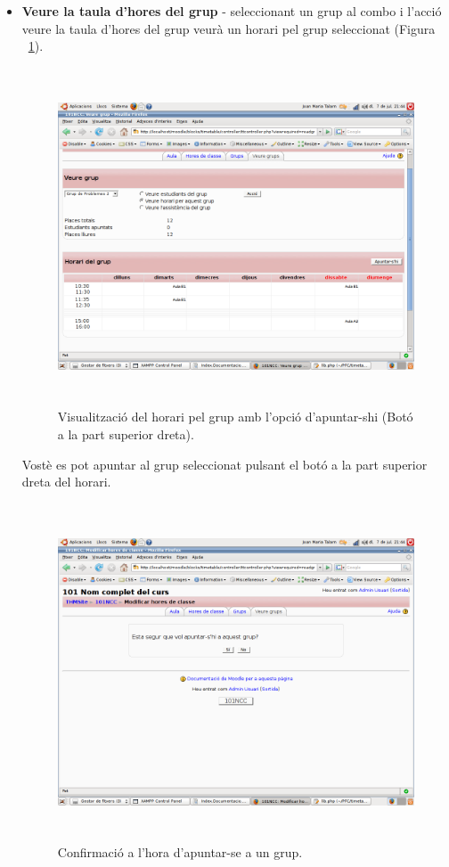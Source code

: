 \documentclass[a4paper]{report}  %
\begin{document}
\begin{itemize}
\item\textbf{Veure la taula d'hores del grup} - seleccionant un grup al combo i l'acció veure la taula d'hores del grup veurà un horari pel grup seleccionat (Figura ~\ref{fig:VeureGrupsHorari}).
		\begin{figure}[H] %
		\begin{center}
		\includegraphics[height=10cm,width=12cm]{img/VeureGrupsHorari.png}
		\caption[List caption]{Visualització del horari pel grup amb l'opció d'apuntar-shi (Botó a la part superior dreta).}
		\label{fig:VeureGrupsHorari}
		\end{center}
		\end{figure}
Vostè es pot apuntar al grup seleccionat pulsant el botó a la part superior dreta del horari.
		\begin{figure}[H] %
		\begin{center}
		\includegraphics[height=10cm,width=12cm]{img/VeureGrupConfirmaApuntarse.png}
		\caption[List caption]{Confirmació a l'hora d'apuntar-se a un grup.}
		\label{fig:VeureGrupConfirmaApuntarse}
		\end{center}
		\end{figure}


\end{itemize}
\end{document}
